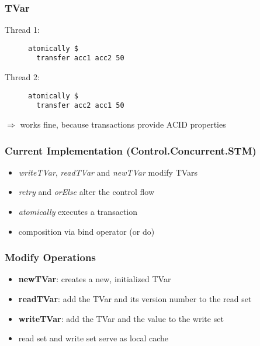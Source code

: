 \documentclass{beamer}
\begin{document}
  \begin{frame}[fragile]
    \frametitle{TVar}
    \fboxsep=0pt
    \noindent
    \begin{minipage}[t]{0.48\linewidth}
      Thread 1:
      \begin{figure}
       \begin{lstlisting}[frame=single]
atomically $ 
  transfer acc1 acc2 50
       \end{lstlisting}
      \end{figure}
    \end{minipage}%
    \hfill%
    \begin{minipage}[t]{0.48\linewidth}
      Thread 2:
      \begin{figure}
       \begin{lstlisting}[frame=single]
atomically $ 
  transfer acc2 acc1 50
       \end{lstlisting}
      \end{figure}
    \end{minipage}
    \vfill
    \pause
    $\Rightarrow$ works fine, because transactions provide ACID properties
\end{frame}
  \begin{frame}
    \frametitle{Current Implementation (Control.Concurrent.STM)}
    \begin{itemize}\setlength\itemsep{1em}
      \item \textit{writeTVar}, \textit{readTVar} and \textit{newTVar} modify TVars
      \item \textit{retry} and \textit{orElse} alter the control flow
      \item \textit{atomically} executes a transaction 
      \item composition via bind operator (or do)
    \end{itemize}
  \end{frame}
  
  \begin{frame}
   \frametitle{Modify Operations}
   \begin{itemize}\setlength\itemsep{1em}
    \item \textbf{newTVar}: creates a new, initialized TVar 
    \item \textbf{readTVar}: add the TVar and its version number to the read set
    \item \textbf{writeTVar}: add the TVar and the value to the write set
    \item read set and write set serve as local cache 
  \end{itemize}
  \end{frame}
  
\end{document}
